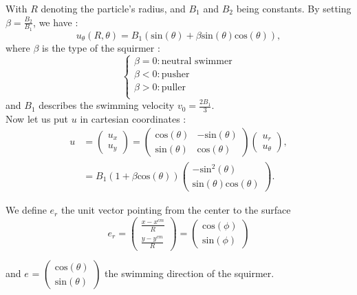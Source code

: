 \documentclass{article}
\begin{document}
With $R$ denoting the particle's radius, and $B_1$ and $B_2$ being constants. By setting $\beta=\frac{B_2}{B_1}$, we have :
$$
u_\theta(R,\theta) = B_1(\mathrm{sin}(\theta) + \beta \mathrm{sin}(\theta)\mathrm{cos}(\theta)),
$$
where $\beta$ is the type of the squirmer :
$$\left\{
    \begin{array}{ll}
        \beta = 0 : \text{neutral swimmer}  \\
        \beta < 0 : \mathrm{pusher} \\
        \beta > 0 : \mathrm{puller} \\
    \end{array}
\right.$$
and $B_1$ describes the swimming velocity $v_0 = \frac{2 B_1}{3}$.
\\ Now let us put $u$ in cartesian coordinates :
\begin{align*}
    u &= \begin{pmatrix}
   u_x \\
   u_y
\end{pmatrix}
= \begin{pmatrix}
   \mathrm{cos}(\theta) & -\mathrm{sin}(\theta) \\
   \mathrm{sin}(\theta) & \mathrm{cos}(\theta)
\end{pmatrix}
\begin{pmatrix}
   u_r \\
   u_\theta
\end{pmatrix}, \\
&= B_1 (1 + \beta \mathrm{cos}(\theta))
\begin{pmatrix}
   -\mathrm{sin}^2(\theta) \\
   \mathrm{sin}(\theta)\mathrm{cos}(\theta)
\end{pmatrix}.
\end{align*}

We define $e_r$ the unit vector pointing from the center to the surface 
$$
e_r = \begin{pmatrix}
   \frac{x - x^{cm}}{R}  \\
   \frac{y - y^{cm}}{R} 
\end{pmatrix} = \begin{pmatrix}
   \mathrm{cos}(\phi) \\
   \mathrm{sin}(\phi)
\end{pmatrix}$$ 

and $e$ = 
$\begin{pmatrix}
   \mathrm{cos}(\theta) \\
   \mathrm{sin}(\theta) \end{pmatrix}$ the swimming direction of the squirmer. 
   
\end{document}

